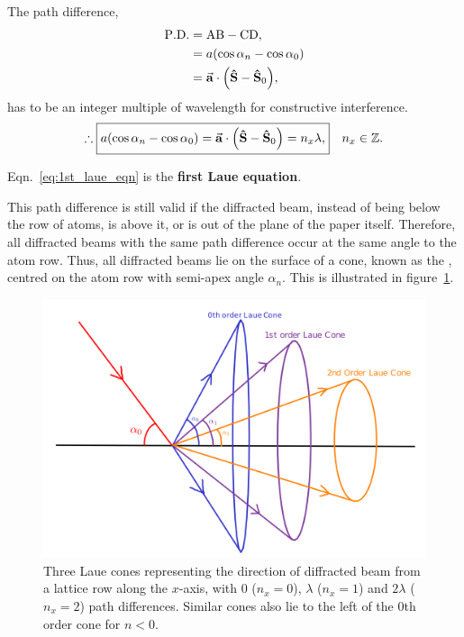 	The path difference,%
%		
		\begin{align}
		\mathrm{P.D.} &= \mathrm{AB - CD}, \nonumber\\
					  &= a \qty( \cos \alpha_n - \cos \alpha_0 ) \\
					  &= \va{a} \cdot \qty( \vu{S} - \vu{S}_0 ),
		\end{align}%
%		
	has to be an integer multiple of wavelength for constructive interference.%
%		
		\begin{equation}
		\therefore \boxed{a \qty( \cos \alpha_n - \cos \alpha_0 ) = \va{a} \cdot \qty( \vu{S} - \vu{S}_0 ) = n_x \lambda,} \quad n_x \in \mathbb{Z}. \label{eq:1st_laue_eqn}
		\end{equation}
		
	Eqn.~\eqref{eq:1st_laue_eqn} is the \textbf{first Laue equation}.
	
	This path difference is still valid if the diffracted beam, instead of being below the row of atoms, is above it, or is out of the plane of the paper itself. Therefore, all diffracted beams with the same path difference occur at the same angle to the atom row. Thus, all diffracted beams lie on the surface of a cone, known as the , centred on the atom row with semi-apex angle $\alpha_n.$ This is illustrated in figure~\ref{fig:laue_cones}.
	
	\begin{figure}
	\centering
	\includegraphics[scale=0.17]{laue_cones.png}
	\caption{\label{fig:laue_cones}Three Laue cones representing the direction of diffracted beam from a lattice row along the $x$-axis, with $0$ ($n_x = 0$), $\lambda$ ($n_x = 1$) and $2\lambda$ ($n_x = 2$) path differences. Similar cones also lie to the left of the 0th order cone for $n < 0.$}
	\end{figure}
	

